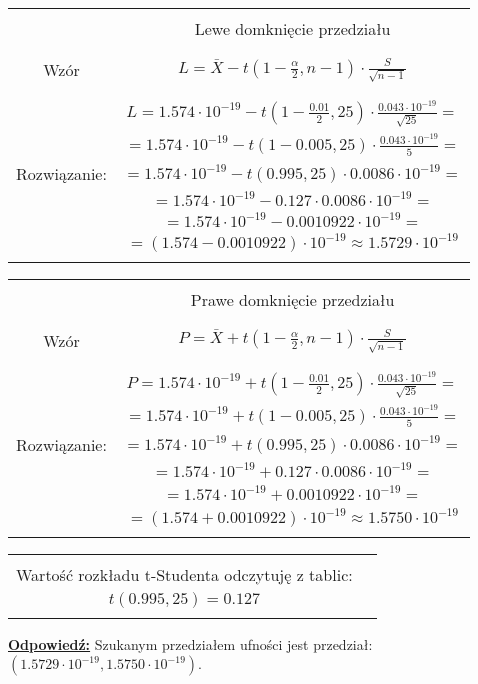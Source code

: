 \begin{center}
\begin{tabular}{ |c|c| } 
\hline
& \\
& Lewe domknięcie przedziału \\ 
& \\ \hline
& \\
Wzór & $L = \bar X - t \left(1-\frac{\alpha}{2},n-1 \right) \cdot \frac{S}{\sqrt{n-1}}$ \\
& \\\hline
& \\
& $L = 1.574 \cdot 10^{-19} - t \left(1-\frac{0.01}{2}, 25 \right) \cdot \frac{0.043 \cdot 10^{-19}}{\sqrt{25}} = $ \\
& $= 1.574 \cdot 10^{-19} - t \left(1 - 0.005, 25 \right) \cdot \frac{0.043 \cdot 10^{-19}}{5} = $ \\
Rozwiązanie: & $= 1.574 \cdot 10^{-19} - t \left(0.995, 25 \right) \cdot 0.0086 \cdot 10^{-19} = $ \\
& $= 1.574 \cdot 10^{-19} - 0.127 \cdot 0.0086 \cdot 10^{-19}= $ \\
& $=  1.574 \cdot 10^{-19} - 0.0010922 \cdot 10^{-19} = $ \\
& $= (1.574 - 0.0010922) \cdot  10^{-19} \approx 1.5729 \cdot 10^{-19} $ \\
& \\\hline
\end{tabular}

\begin{tabular}{ |c|c| } 
\hline
& \\
& Prawe domknięcie przedziału \\ 
& \\ \hline
& \\
Wzór & $P = \bar X + t \left(1-\frac{\alpha}{2},n-1 \right) \cdot \frac{S}{\sqrt{n-1}}$ \\
& \\\hline
& \\
&  $P =  1.574 \cdot 10^{-19} + t \left(1-\frac{0.01}{2}, 25 \right) \cdot \frac{0.043 \cdot 10^{-19}}{\sqrt{25}} = $  \\
& $= 1.574 \cdot 10^{-19} + t \left(1 - 0.005, 25 \right) \cdot \frac{0.043 \cdot 10^{-19}}{5}= $  \\
Rozwiązanie: & $=  1.574 \cdot 10^{-19} + t \left(0.995, 25 \right) \cdot 0.0086 \cdot 10^{-19} = $ \\
& $= 1.574 \cdot 10^{-19} + 0.127 \cdot 0.0086 \cdot 10^{-19} = $ \\
& $= 1.574 \cdot 10^{-19} + 0.0010922 \cdot 10^{-19} = $ \\
&  $= (1.574 + 0.0010922) \cdot  10^{-19} \approx 1.5750 \cdot  10^{-19}$  \\
& \\\hline
\end{tabular}
\begin{tabular}{ |c c| } 
\hline
&  \\
Wartość rozkładu t-Studenta odczytuję z tablic:  &\\
$t(0.995, 25) = 0.127$  & \\
& \\ \hline
\end{tabular}
\end{center} 
\textbf{\underline{Odpowiedź:}} \large{Szukanym przedziałem ufności jest przedział: \textbf{$\left( 1.5729 \cdot 10^{-19}, 1.5750 \cdot  10^{-19} \right)$}.}
